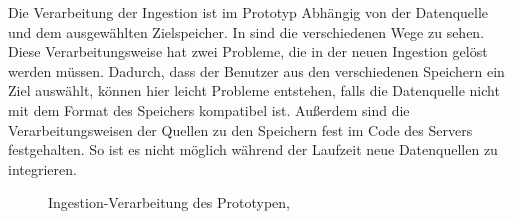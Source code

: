 Die Verarbeitung der Ingestion ist im Prototyp Abhängig von der Datenquelle und dem ausgewählten Zielspeicher.
In  sind die verschiedenen Wege zu sehen.
Diese Verarbeitungsweise hat zwei Probleme, die in der neuen Ingestion gelöst werden müssen.
Dadurch, dass der Benutzer aus den verschiedenen Speichern ein Ziel auswählt, können hier leicht Probleme entstehen, falls die Datenquelle nicht mit dem Format des Speichers kompatibel ist.
Außerdem sind die Verarbeitungsweisen der Quellen zu den Speichern fest im Code des Servers festgehalten.
So ist es nicht möglich während der Laufzeit neue Datenquellen zu integrieren.

\begin{figure}
    \centering
    \caption{Ingestion-Verarbeitung des Prototypen, }
    \label{fig:prototyp-ingestion}
\end{figure}